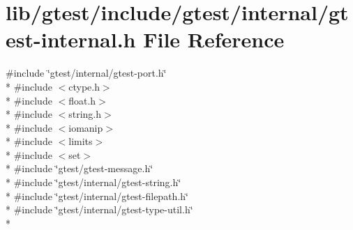 \hypertarget{gtest-internal_8h}{\section{lib/gtest/include/gtest/internal/gtest-\/internal.h File Reference}
\label{gtest-internal_8h}
}
{\ttfamily \#include \char`\"{}gtest/internal/gtest-\/port.\-h\char`\"{}}\\*
{\ttfamily \#include $<$ctype.\-h$>$}\\*
{\ttfamily \#include $<$float.\-h$>$}\\*
{\ttfamily \#include $<$string.\-h$>$}\\*
{\ttfamily \#include $<$iomanip$>$}\\*
{\ttfamily \#include $<$limits$>$}\\*
{\ttfamily \#include $<$set$>$}\\*
{\ttfamily \#include \char`\"{}gtest/gtest-\/message.\-h\char`\"{}}\\*
{\ttfamily \#include \char`\"{}gtest/internal/gtest-\/string.\-h\char`\"{}}\\*
{\ttfamily \#include \char`\"{}gtest/internal/gtest-\/filepath.\-h\char`\"{}}\\*
{\ttfamily \#include \char`\"{}gtest/internal/gtest-\/type-\/util.\-h\char`\"{}}\\*

